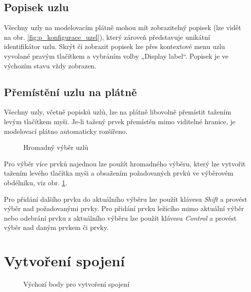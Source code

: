 \documentclass[czech,DP]{thesiskiv}
\begin{document}
\subsection{Popisek uzlu}

Všechny uzly na modelovacím plátně mohou mít zobrazitelný popisek (lze vidět na obr. \ref{fig:p_konfigurace_uzel}), který zároveň představuje unikátní identifikátor uzlu. Skrýt či zobrazit popisek lze přes kontextové menu uzlu vyvolané pravým tlačítkem a vybráním volby „Display label“. Popisek je ve výchozím stavu vždy zobrazen.

\subsection{Přemístění uzlu na plátně}

Všechny uzly, včetně popisků uzlů, lze na plátně libovolně přemístit tažením levým tlačítkem myši. Je-li tažený prvek přemístěn mimo viditelné hranice, je modelovací plátno automaticky rozšířeno. 

\begin{figure}
\centering
\caption{Hromadný výběr uzlů}
\label{fig:p_hromadny_vyber}
\end{figure}

Pro výběr více prvků najednou lze použít hromadného výběru, který lze vytvořit tažením levého tlačítka myši a obsažením požadovaných prvků ve výběrovém obdélníku, viz obr. \ref{fig:p_hromadny_vyber}. 

Pro přidání dalšího prvku do aktuálního výběru lze použít klávesu \textit{Shift} a provést výběr nad požadovanými prvky. Pro přidání prvku ležícího mimo aktuální výběr nebo odebrání prvku z aktuálního výběru lze použít klávesu \textit{Control} a provést výběr nad daným prvkem či prvky.

\section{Vytvoření spojení}

\begin{figure}
\centering
\caption{Výchozí body pro vytvoření spojení}
\label{fig:p_vytvoreni_spojeni_rohy}
\end{figure}
\end{document}
